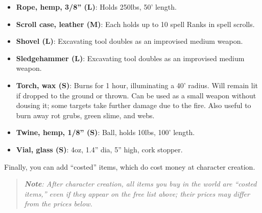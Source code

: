 \documentclass{book}
\begin{document}
\begin{itemize}
  chance of setting off most traps.
\item
  \textbf{Rope, hemp, 3/8'' (L)}: Holds 250lbs, 50' length.
\item
  \textbf{Scroll case, leather (M)}: Each holds up to 10 spell Ranks in
  spell scrolls.
\item
  \textbf{Shovel (L)}: Excavating tool doubles as an improvised medium
  weapon.
\item
  \textbf{Sledgehammer (L)}: Excavating tool doubles as an improvised
  medium weapon.
\item
  \textbf{Torch, wax (S)}: Burns for 1 hour, illuminating a 40' radius.
  Will remain lit if dropped to the ground or thrown. Can be used as a
  small weapon without dousing it; some targets take further damage due
  to the fire. Also useful to burn away rot grubs, green slime, and
  webs.
\item
  \textbf{Twine, hemp, 1/8'' (S)}: Ball, holds 10lbs, 100' length.
\item
  \textbf{Vial, glass (S)}: 4oz, 1.4'' dia, 5'' high, cork stopper.
\end{itemize}

Finally, you can add ``costed'' items, which do cost money at character
creation.

\begin{quote}
\emph{\textbf{Note}: After character creation, all items you buy in the
world are ``costed items,'' even if they appear on the free list above;
their prices may differ from the prices below.}
\end{quote}

\newpage
\end{document}
